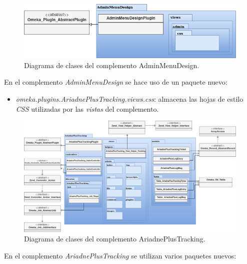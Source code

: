 \documentclass[
]{article}
\providecommand{\tightlist}{%
  \setlength{\itemsep}{0pt}\setlength{\parskip}{0pt}}
\begin{document}
\begin{figure}
\hypertarget{da-pck-5}{%
\centering
\includegraphics{../_static/images/pck-5.png}
\caption{Diagrama de clases del complemento
AdminMenuDesign.}\label{da-pck-5}
}
\end{figure}

En el complemento \emph{AdminMenuDesign} se hace uso de un paquete
nuevo:

\begin{itemize}
\tightlist
\item
  \emph{omeka.plugins.AriadnePlusTracking.views.css}: almacena las hojas
  de estilo \emph{CSS} utilizadas por las \emph{vistas} del complemento.
\end{itemize}

\begin{figure}
\hypertarget{da-pck-6}{%
\centering
\includegraphics{../_static/images/pck-6.png}
\caption{Diagrama de clases del complemento
AriadnePlusTracking.}\label{da-pck-6}
}
\end{figure}

En el complemento \emph{AriadnePlusTracking} se utilizan varios paquetes
nuevos:
\end{document}
